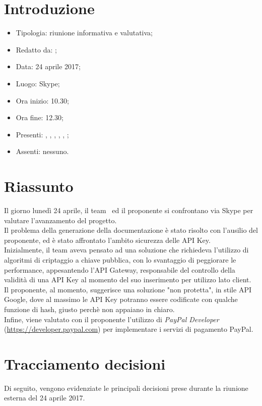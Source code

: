 \section{Introduzione}

	\begin{itemize}
		\item Tipologia: riunione informativa e valutativa;
		\item Redatto da: \AS;
		\item Data: 24 aprile 2017;
		\item Luogo: Skype;
		\item Ora inizio: 10.30;
		\item Ora fine: 12.30;
		\item Presenti: \DS, \NS, \MC, \DAN, \AS, \AN;	
		\item Assenti: nessuno.
	\end{itemize}

\section{Riassunto}
Il giorno lunedì 24 aprile, il team \gruppo\ ed il proponente si confrontano via Skype per valutare l'avanzamento del progetto.\\
Il problema della generazione della documentazione è stato risolto con l'ausilio del proponente, ed è stato affrontato l'ambito sicurezza delle API Key.\\
Inizialmente, il team aveva pensato ad una soluzione che richiedeva l'utilizzo di algoritmi di criptaggio a chiave pubblica, con lo svantaggio di peggiorare le performance,  appesantendo l'API Gateway, responsabile del controllo della validità di una API Key al momento del suo inserimento per utilizzo lato client.\\
Il proponente, al momento, suggerisce una soluzione "non protetta", in stile API Google, dove al massimo le API Key potranno essere codificate con qualche funzione di hash, giusto perchè non appaiano in chiaro.\\
Infine, viene valutato con il proponente l'utilizzo di \textit{PayPal Developer} (\url{https://developer.paypal.com}) per implementare i servizi di pagamento PayPal.

\section{Tracciamento decisioni}
Di seguito, vengono evidenziate le principali decisioni prese durante la riunione esterna del 24 aprile 2017.

